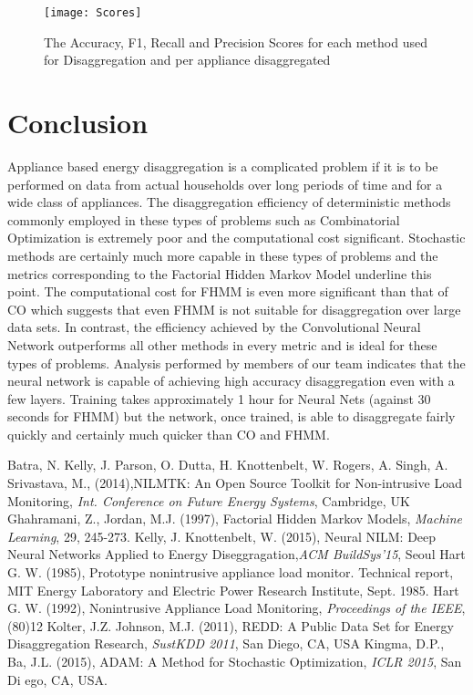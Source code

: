 \documentclass[10pt]{article}
\begin{document}
\begin{figure}[!ht]
  \centering
  \texttt{[image: Scores]}
  \caption{The Accuracy, F1, Recall and Precision Scores for each method used for Disaggregation and per appliance
disaggregated}\label{fig:scores}
\end{figure}
%

\section{Conclusion}
Appliance based energy disaggregation is a complicated problem if it is to be performed on data from actual households over long periods of time and for a wide class of appliances. The disaggregation efficiency of deterministic methods commonly employed in these types of problems such as Combinatorial Optimization is extremely poor and the computational cost significant. Stochastic methods are certainly much more capable in these types of problems and the metrics corresponding to the Factorial Hidden Markov Model underline this point. The computational cost for FHMM is even more significant than that of CO which suggests that even FHMM is not suitable for disaggregation over large data sets. In contrast, the efficiency achieved by the Convolutional Neural Network outperforms all other methods in every metric and is ideal for these types of problems. Analysis performed by members of our team indicates that the neural network is capable of achieving high accuracy disaggregation even with a few layers. Training takes approximately 1 hour for Neural Nets (against 30 seconds for FHMM) but the network, once trained, is able to disaggregate fairly quickly and certainly much quicker than CO and FHMM.



\begin{thebibliography}{9999}
Batra, N. Kelly, J. Parson, O. Dutta, H. Knottenbelt, W. Rogers, A. Singh, A. Srivastava, M., (2014),NILMTK: An Open Source Toolkit for Non-intrusive Load Monitoring, \textit{Int. Conference on Future Energy Systems}, Cambridge, UK
Ghahramani, Z., Jordan, M.J. (1997), Factorial Hidden Markov Models, \textit{Machine Learning}, 29, 245-273.
Kelly, J. Knottenbelt, W. (2015), Neural NILM: Deep Neural Networks Applied to Energy Diseggragation,\textit{ACM BuildSys'15}, Seoul
Hart G. W. (1985), Prototype nonintrusive appliance load monitor. Technical report, MIT Energy Laboratory and Electric Power Research Institute, Sept. 1985.
Hart G. W. (1992), Nonintrusive Appliance Load Monitoring, \textit{Proceedings of the IEEE}, (80)12
Kolter, J.Z. Johnson, M.J. (2011), REDD: A Public Data Set for Energy Disaggregation Research, \textit{SustKDD 2011}, San Diego, CA, USA
Kingma, D.P., Ba, J.L. (2015), ADAM: A Method for Stochastic Optimization, \textit{ICLR 2015}, San Di    ego, CA, USA.
\end{thebibliography}
\end{document}
